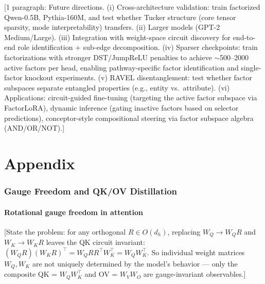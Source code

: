 \documentclass[11pt]{article}
\begin{document}

[1 paragraph: Future directions. (i) Cross-architecture validation:
train factorized Qwen-0.5B, Pythia-160M, and test whether Tucker
structure (core tensor sparsity, mode interpretability) transfers.
(ii) Larger models (GPT-2 Medium/Large).
(iii) Integration with weight-space circuit discovery for end-to-end
role identification + sub-edge decomposition.
(iv) Sparser checkpoints: train factorizations with stronger DST/JumpReLU
penalties to achieve $\sim$500--2000 active factors per head, enabling
pathway-specific factor identification and single-factor knockout experiments.
(v) RAVEL disentanglement: test whether factor subspaces separate
entangled properties (e.g., entity vs.\ attribute).
(vi) Applications: circuit-guided fine-tuning (targeting the active
factor subspace via FactorLoRA), dynamic inference (gating inactive
factors based on selector predictions), conceptor-style compositional
steering via factor subspace algebra (AND/OR/NOT).]


\newpage


\appendix
\part*{Appendix}


\section{Gauge Freedom and QK/OV Distillation}
\label{app:gauge}


\subsection{Rotational gauge freedom in attention}

[State the problem: for any orthogonal $R \in O(d_h)$, replacing
$W_Q \to W_Q R$ and $W_K \to W_K R$ leaves the QK circuit invariant:
$(W_Q R)(W_K R)^\top = W_Q R R^\top W_K^\top = W_Q W_K^\top$.
So individual weight matrices $W_Q, W_K$ are not uniquely determined
by the model's behavior --- only the composite QK = $W_Q W_K^\top$
and OV = $W_V W_O$ are gauge-invariant observables.]
\end{document}
